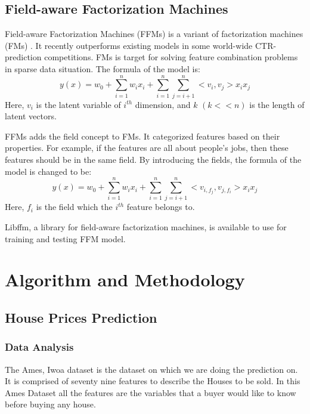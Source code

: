 \documentclass[fleqn,10pt]{SelfArx} %
\begin{document}
\subsection{Field-aware Factorization Machines}
Field-aware Factorization Machines (FFMs) \cite{juan2016field} is a variant of factorization machines (FMs) \cite{rendle2010factorization}. It recently outperforms existing models in some world-wide CTR-prediction competitions. FMs is target for solving feature combination problems in sparse data situation. The formula of the model is:
\begin{equation}
y(x) = w_0 + \sum_{i=1}^{n} w_i x_i + \sum_{i=1}^{n}\sum_{j=i+1}^{n}<v_i, v_j>x_i x_j
\end{equation}
Here, $v_i$ is the latent variable of $i^{th}$ dimension, and $k$ $(k << n)$ is the length of latent vectors. 

FFMs adds the field concept to FMs. It categorized features based on their properties. For example, if the features are all about people's jobs, then these features should be in the same field. By introducing the fields, the formula of the model is changed to be:
\begin{equation}
 y(x) = w_0 + \sum_{i=1}^{n} w_i x_i + \sum_{i=1}^{n}\sum_{j=i+1}^{n}<v_{i,f_{j}}, v_{j,f_{i}}>x_i x_j
\end{equation}
Here, $f_i$ is the field which the $i^{th}$ feature belongs to.

Libffm\cite{libffm}, a library for field-aware factorization machines, is available to use for training and testing FFM model.


\section{Algorithm and Methodology} \label{methodology}

\subsection{House Prices Prediction}

 \subsubsection{Data Analysis}

The Ames, Iwoa dataset is the dataset on which we are doing the prediction on. 
It is comprised of seventy nine features to describe the Houses to be sold. In this Ames Dataset 
all the features are the variables that a buyer would like to know before buying any house.
\end{document}
